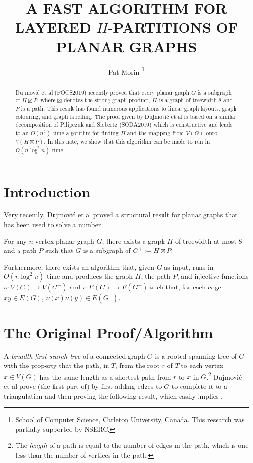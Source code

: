 \documentclass[kpfonts]{patmorin}
\title{\MakeUppercase{A Fast Algorithm for Layered $H$-Partitions of Planar Graphs}}
\author{
  Pat Morin%
    \thanks{School of Computer Science, Carleton University, Canada. This research was partially supported by NSERC.}
}
\begin{document}
\maketitle

\begin{abstract}
  Dujmović et al (FOCS2019) recently proved that every planar graph $G$ is a subgraph of $H\boxtimes P$, where $\boxtimes$ denotes the strong graph product, $H$ is a graph of treewidth 8 and $P$ is a path.  This result has found numerous applications to linear graph layouts, graph colouring, and graph labelling.  The proof given by Dujmović et al is based on a similar decomposition of Pilipczuk and Siebertz (SODA2019) which is constructive and leads to an $O(n^2)$ time algorithm for finding $H$ and the mapping from $V(G)$ onto $V(H\boxtimes P)$.  In this note, we show that this algorithm can be made to run in $O(n\log^2 n)$ time.
\end{abstract}

\section{Introduction}

Very recently, Dujmović et al proved a structural result for planar graphs that has been used to solve a number
\begin{thm}
  For any $n$-vertex planar graph $G$, there exists a graph $H$ of treewidth at most 8 and a path $P$ such that $G$ is a subgraph of $G^+:=H\boxtimes P$.

  Furthermore, there exists an algorithm that, given $G$ as input, runs in $O(n\log^2 n)$ time and produces the graph $H$, the path $P$, and injective functions $\nu:V(G)\to V(G^+)$ and $\epsilon:E(G)\to E(G^+)$ such that, for each edge $xy\in E(G)$,  $\nu(x)\nu(y)\in E(G^+)$.
\end{thm}





\section{The Original Proof/Algorithm}

A \emph{breadth-first-search tree} of a connected graph $G$ is a rooted spanning tree of $G$ with the property that the path, in $T$, from the root $r$ of $T$ to each vertex $x\in V(G)$ has the same length as a shortest path from $r$ to $x$ in $G$.\footnote{The \emph{length} of a path is equal to the number of edges in the path, which is one less than the number of vertices in the path.}  Dujmović et al \cite{dujmovic.joret.ea:planar} prove (the first part of)  by first adding edges to $G$ to complete it to a triangulation and then proving the following result, which easily implies .
\end{document}
